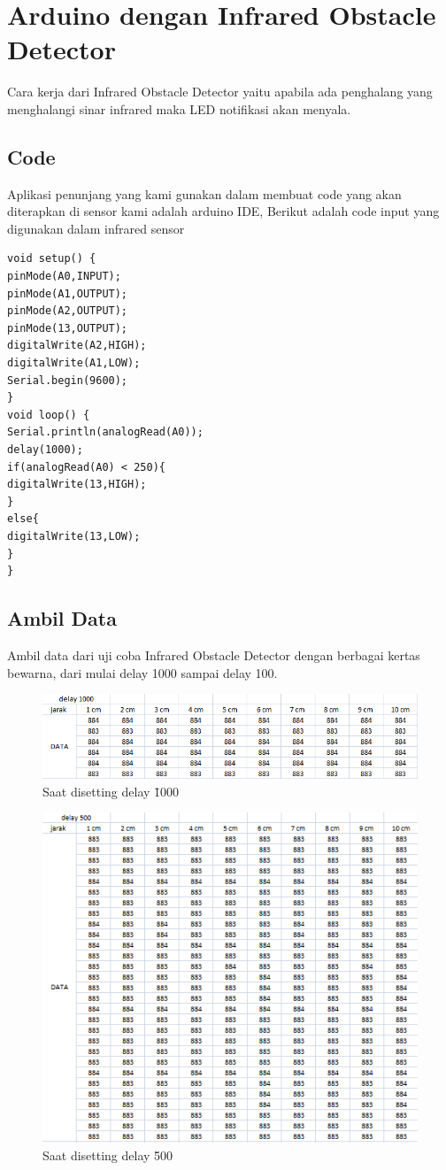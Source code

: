 \section{Arduino dengan Infrared Obstacle Detector}
Cara kerja dari Infrared Obstacle Detector yaitu apabila ada penghalang yang menghalangi sinar infrared maka LED notifikasi akan menyala.
\subsection {Code}
Aplikasi penunjang yang kami gunakan dalam membuat code yang akan diterapkan di sensor kami adalah arduino IDE, Berikut adalah code input yang digunakan dalam infrared sensor
\begin {verbatim}
void setup() {
pinMode(A0,INPUT);
pinMode(A1,OUTPUT);
pinMode(A2,OUTPUT);
pinMode(13,OUTPUT);
digitalWrite(A2,HIGH);
digitalWrite(A1,LOW);
Serial.begin(9600);
}
void loop() {
Serial.println(analogRead(A0));
delay(1000);
if(analogRead(A0) < 250){
digitalWrite(13,HIGH);
}
else{
digitalWrite(13,LOW);
}
}
\end{verbatim}

\subsection{Ambil Data}
Ambil data dari uji coba Infrared Obstacle Detector dengan berbagai kertas bewarna, dari mulai delay 1000 sampai delay 100.
 \begin{figure}[!htbp]
  \centering
  \includegraphics[width=.75\textwidth]{figures/build/delay_1000.png}
  \caption{Saat disetting delay \= 1000}\label{fig:1000}
\end{figure}

 \begin{figure}[!htbp]
  \centering
  \includegraphics[width=.75\textwidth]{figures/build/delay_500.png}
  \caption{Saat disetting delay \= 500}\label{fig:500}
\end{figure}

